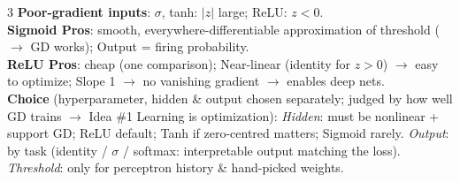 \documentclass[10pt]{article}
\newcommand{\sub}[1]{\textit{#1}:}  %
\begin{document}
\begin{multicols*}{3}
\textbf{Poor-gradient inputs}: $\sigma$, tanh: $|z|$ large; ReLU: $z<0$.\\
\textbf{Sigmoid Pros}: smooth, everywhere-differentiable approximation of threshold ($\to$ GD works); Output = firing probability.\\
\textbf{ReLU Pros}: cheap (one comparison); Near-linear (identity for $z>0$) $\to$ easy to optimize; Slope 1 $\to$ no vanishing gradient $\to$ enables deep nets.\\
\textbf{Choice} (hyperparameter, hidden \& output chosen separately; judged by how well GD trains $\to$ Idea \#1 Learning is optimization): \sub{Hidden} must be nonlinear + support GD; ReLU default; Tanh if zero-centred matters; Sigmoid rarely. \sub{Output} by task (identity / $\sigma$ / softmax: interpretable output matching the loss). \sub{Threshold} only for perceptron history \& hand-picked weights.


\end{multicols*}
\end{document}
